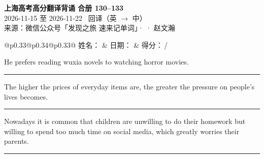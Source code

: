 \documentclass[11pt,a4paper]{article}
\newcommand{\num}[1]{\makebox[1.9em][r]{#1.}\hspace{0.3em}}
\newcommand{\wline}{\noindent\rule{\linewidth}{0.4pt}}
\begin{document}
\pagestyle{plain}
\begin{center}
{\LARGE\bfseries 上海高考高分翻译背诵 \quad 合册 130–133}\\[0.25em]
{\large 2026-11-15 至 2026-11-22 \quad\ 回译（英 $\to$ 中）}\\[0.35em]
{\footnotesize 来源：微信公众号「发现之旅 速来记单词」·  · 赵文瀚}
\end{center}

\vspace{0.4em}
\noindent\begin{tabular}{@{}p{0.33\textwidth}@{}p{0.34\textwidth}@{}p{0.33\textwidth}@{}}
姓名：\underline{\hspace{2.0cm}} & 日期：\underline{\hspace{2.0cm}} & 得分：\underline{\hspace{1.4cm}}\,/ \\
\end{tabular}

\vspace{0.5em}

\vspace{0.8em}
\vspace{0.35em}\vspace{0.15em}

\begin{minipage}{\linewidth}

\num{1}He prefers reading wuxia novels to watching horror movies.

\vspace{0.25em}

\wline

\end{minipage}

\begin{minipage}{\linewidth}

\num{2}The higher the prices of everyday items are, the greater the pressure on people’s lives becomes.

\vspace{0.25em}

\wline

\end{minipage}

\begin{minipage}{\linewidth}

\num{3}Nowadays it is common that children are unwilling to do their homework but willing to spend too much time on social media, which greatly worries their parents.

\vspace{0.25em}

\wline

\end{minipage}
\end{document}
